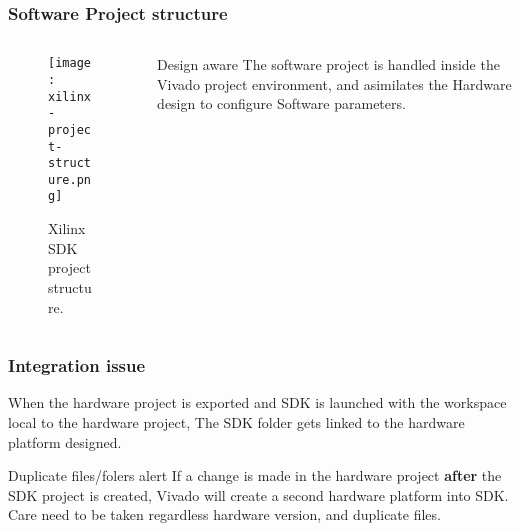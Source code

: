 \begin{frame}
	\frametitle{Software Project structure}
	\begin{columns}
		\begin{column}{0.5\textwidth}
			\begin{figure}
				\texttt{[image: xilinx-project-structure.png]}
				\caption{Xilinx SDK project structure.}\label{fig:xilinx-project-structure}
			\end{figure}
		\end{column}
		\begin{column}{0.5\textwidth}
			\begin{block}{Design aware}
				The software project is handled inside the Vivado project environment, and asimilates the Hardware design to configure Software parameters.
			\end{block}
		\end{column}
	\end{columns}
\end{frame}

\begin{frame}
	\frametitle{Integration issue}
	When the hardware project is exported and SDK is launched with the workspace local to the hardware project, The SDK folder gets linked to the hardware platform designed.
	\vfill
	\begin{alertblock}{Duplicate files/folers alert}
		If a change is made in the hardware project \textbf{after} the SDK project is created, Vivado will create a second hardware platform into SDK. Care need to be taken regardless hardware version, and duplicate files.
	\end{alertblock}
\end{frame}